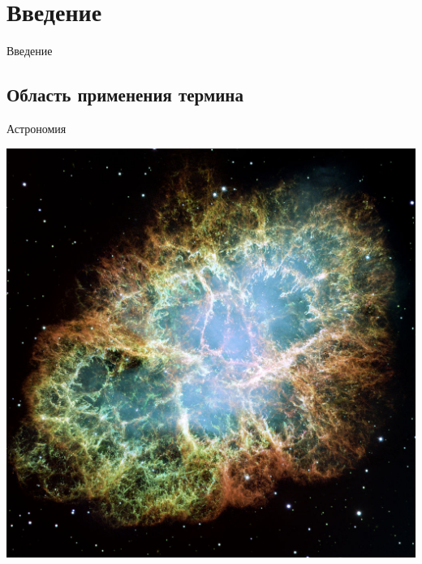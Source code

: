 \documentclass[usenames,dvipsnames,pdftex,unicode,hidelinks]{beamer}
\title[Чёрные дыры]{
  \texorpdfstring{
    \begin{tikzpicture}[scale=0.9]
      \foreach \x in {0, ..., 6}
        \shade[shading=ball, ball color=black] (2.5*\x - 0.15*\x*\x, 0) circle (1-\x*0.15);
    \end{tikzpicture}
    \\
  }{}Чёрные дыры
}
\author[Иван Новиков]{
  Новиков Иван Александрович\texorpdfstring{
    \\
    \vspace{0.3cm}
    \small 1 курс магистратуры ФТФ, напр. Физика
  }{
    - КубГУ, ФТФ, 1 курс магистратуры
  }
}
\institute{Кубанский Государственный Университет}
\date{ 29 мая 2013 г. }
\newcommand{\splashsection}[1]{
    \section{#1}
    \begin{frame}[plain]
      \begin{center}
        \huge #1
      \end{center}
    \end{frame}
  }
\begin{document}
  
  \begin{frame}[plain]
    \titlepage
  \end{frame}

  \splashsection{Введение}
  \subsection{Область применения термина}

  \begin{frame}{Астрономия}
    \begin{center}
      \includegraphics[height=0.8\textheight]{crab-nebula}
     \end{center}
  \end{frame}
\end{document}
